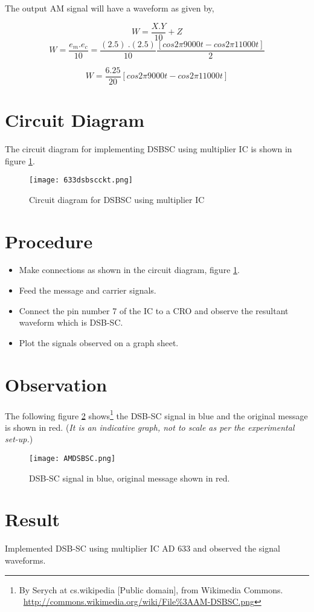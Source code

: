 The output AM signal will have a waveform as given by,

\begin{equation}
W=\frac{X.Y}{10}+Z
\end{equation}
\begin{equation}
W=\frac{e_m.e_c}{10}=\frac{(2.5) \ .(2.5)}{10}\frac{[cos 2\pi9000t-cos 2\pi11000t]}{2}
\end{equation}

\begin{equation}
W=\frac{6.25}{20}[cos 2\pi9000t-cos 2\pi11000t]
\end{equation} 

\section*{Circuit Diagram}
The circuit diagram for implementing DSBSC using multiplier IC is shown in figure \ref{DSBSCckt}.
\begin{figure}[h]
\begin{center}
\texttt{[image: 633dsbscckt.png]}
\caption{Circuit diagram for DSBSC using multiplier IC}
\label{DSBSCckt}
\end{center}

\end{figure}

\section*{Procedure}
\begin{itemize}
\item
Make connections as shown in the circuit diagram, figure \ref{DSBSCckt}.
\item
Feed the message and carrier signals.
\item
Connect the pin number 7 of the IC to a CRO and observe the resultant waveform which is DSB-SC.
\item

Plot the signals observed on a graph sheet.
\end{itemize}
\section*{Observation}

The following figure \ref{DSBSC} shows\footnote{By Serych at cs.wikipedia [Public domain], from Wikimedia Commons.  \ \url{http://commons.wikimedia.org/wiki/File\%3AAM-DSBSC.png}} the DSB-SC signal in blue and the original message is shown in red. (\emph{It is an indicative graph, not to scale as per the experimental set-up.})
\begin{figure}[h]
\begin{center}
\texttt{[image: AMDSBSC.png]}
\caption{DSB-SC signal in blue, original message shown in red.}
\label{DSBSC}
\end{center}

\end{figure}


\section*{Result}
Implemented DSB-SC using multiplier IC AD 633 and observed the signal waveforms.